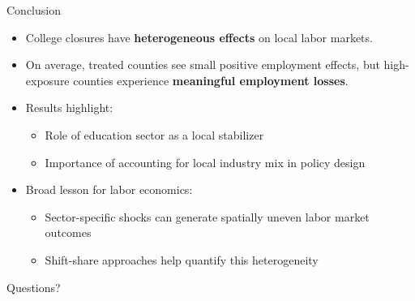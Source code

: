 \documentclass[aspectratio=169]{beamer}
\begin{document}
\begin{frame}{Conclusion}
  \begin{itemize}
    \item College closures have \textbf{heterogeneous effects} on local labor markets.
    \item On average, treated counties see small positive employment effects,
    but high-exposure counties experience \textbf{meaningful employment losses}.
    \item Results highlight:
      \begin{itemize}
        \item Role of education sector as a local stabilizer
        \item Importance of accounting for local industry mix in policy design
      \end{itemize}
    \item Broad lesson for labor economics:
      \begin{itemize}
        \item Sector-specific shocks can generate spatially uneven labor market outcomes
        \item Shift-share approaches help quantify this heterogeneity
      \end{itemize}
  \end{itemize}
\end{frame}

\begin{frame}
  \centering
  \Huge Questions?
\end{frame}
\end{document}
